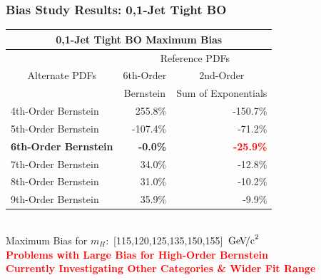 \documentclass{beamer}
\newcommand{\GeVcc}{\ensuremath{\,\mathrm{Ge\kern -0.1em V\!/c}^2}}
\newcommand{\tredbf}[1]{\textcolor{red}{\bf #1}}
\begin{document}
\begin{frame}
\frametitle{Bias Study Results: 0,1-Jet Tight BO}
\scriptsize
\begin{center}
\begin{tabular}{|l|r|r|} \hline 
\multicolumn{3}{|c|}{ \bf 0,1-Jet Tight BO Maximum Bias} \\ \hline
\multicolumn{1}{|c|}{\multirow{3}{*}{Alternate PDFs}} & \multicolumn{2}{c|}{Reference PDFs} \\ \cline{2-3} 
& \multicolumn{1}{c|}{6th-Order} & \multicolumn{1}{c|}{2nd-Order} \\ 
& \multicolumn{1}{c|}{      Bernstein} & \multicolumn{1}{c|}{Sum of Exponentials} \\ \hline
4th-Order Bernstein &          255.8\% &         -150.7\% \\ \hline
5th-Order Bernstein &         -107.4\% &          -71.2\% \\ \hline
\textbf{6th-Order Bernstein} &           \textbf{-0.0\%} &          \tredbf{-25.9\%} \\ \hline
7th-Order Bernstein &           34.0\% &          -12.8\% \\ \hline
8th-Order Bernstein &           31.0\% &          -10.2\% \\ \hline
9th-Order Bernstein &           35.9\% &           -9.9\% \\ \hline
\end{tabular}
\small
\\ \vspace{1em}
Maximum Bias for $m_H:$ [115,120,125,135,150,155] \GeVcc{}
\\
\tredbf{
Problems with Large Bias for High-Order Bernstein
\\ Currently Investigating Other Categories \& Wider Fit Range
}
\end{center}
\end{frame}
\end{document}
